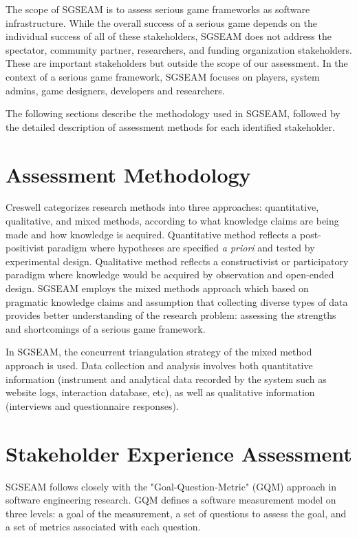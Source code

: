 The scope of SGSEAM is to assess serious game frameworks as software infrastructure. While
the overall success of a serious game depends on the individual success of all of these
stakeholders, SGSEAM does not address the spectator, community partner, researchers, and funding
organization stakeholders. These are important stakeholders but outside the scope of our
assessment. In the context of a serious game framework, SGSEAM focuses on players, system admins, game designers, developers and researchers.

The following sections describe the methodology used in SGSEAM, followed by the detailed
description of assessment methods for each identified stakeholder.

\section{Assessment Methodology}
Creswell \cite{creswell2003} categorizes research methods into three approaches:
quantitative, qualitative, and mixed methods, according to what knowledge claims are being made
and how knowledge is acquired. Quantitative method reflects a post-positivist paradigm where
hypotheses are specified {\em a priori} and tested by experimental design. Qualitative method
reflects a constructivist or participatory paradigm where knowledge would be acquired by
observation and open-ended design. SGSEAM employs the mixed methods approach which based on
pragmatic knowledge claims and assumption that collecting diverse types of data provides better
understanding of the research problem: assessing the strengths and shortcomings of a serious game
framework.

In SGSEAM, the concurrent triangulation strategy \cite{creswell2003} of the mixed method approach
is used.  Data collection and analysis involves both quantitative information (instrument and
analytical data recorded by the system such as website logs, interaction database, etc), as well
as qualitative information (interviews and questionnaire responses).

\section{Stakeholder Experience Assessment}

SGSEAM follows closely with the "Goal-Question-Metric" (GQM) approach \cite{caldiera1994goal} in
software engineering research. GQM defines a software  measurement model on three levels: a goal
of the measurement, a set of questions to assess the goal, and a set of metrics associated with
each question.

